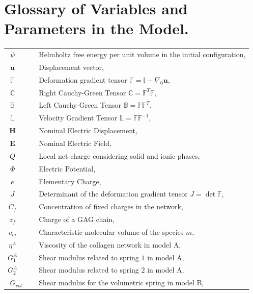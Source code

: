 \documentclass[runningheads]{llncs}
\newcommand{\F}{\ensuremath{\mathbb{F}}}
\newcommand{\LL}{\ensuremath{\mathbb{L}}}
\begin{document}

%

 
\newpage
\appendix
\section{Glossary of Variables and Parameters in the Model.}
\label{glos}
\begin{table}[h!]
\begin{tabular}{c  l}
	$\psi\qquad $ & Helmholtz free energy per unit volume in the initial configuration,\\
	$\mathbf{u}\qquad$ & Displacement vector,\\
	$\F\qquad$ & Deformation gradient tensor $\F=\mathbb{I}-\nabla_0\mathbf{u}$,\\
	$\mathbb{C}\qquad$ & Right Cauchy-Green Tensor $\mathbb{C}=\F^T\F$,\\
	$\mathbb{B}\qquad$ & Left Cauchy-Green Tensor $\mathbb{B}=\F\F^T$,\\
	$\LL\qquad$ & Velocity Gradient Tensor $\LL=\dot{\F}\F^{-1}$,\\
	$\mathbf{H}\qquad$ & Nominal Electric Displacement,\\
	$\mathbf{E}\qquad$ & Nominal Electric Field,\\
	$Q\qquad$ & Local net charge considering solid and ionic phases,\\
	$\Phi\qquad$ & Electric Potential,\\
	$e\qquad$ & Elementary Charge,\\
	$J\qquad$ & Determinant of the deformation gradient tensor $J=\det \F$,\\	
	$C_f\qquad$ & Concentration of fixed charges in the network,\\
	$z_f\qquad$ & Charge of a GAG chain,\\
	$v_m\qquad$ & Characteristic molecular volume of the species $m$,\\
	$\eta^A\qquad $ & Viscosity of the collagen network in model A,\\
	$G^A_1\qquad$ & Shear modulus related to spring $1$ in model A,\\
	$G^A_2\qquad$ & Shear modulus related to spring $2$ in model A,\\
	$G_{vol}\quad$ & Shear modulus for the volumetric spring in model B,\\

\end{tabular}
\end{table}
\end{document}
